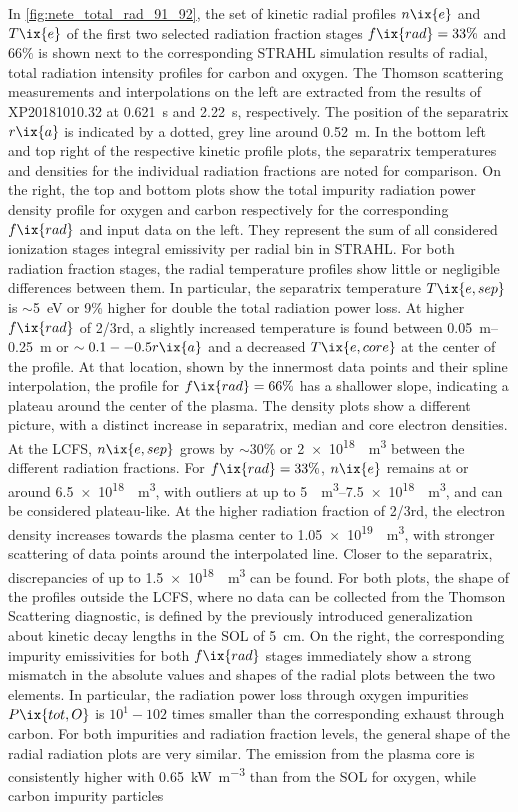         In \cref{fig:nete_total_rad_91_92}, the set of kinetic radial profiles $n\ix{e}$ and $T\ix{e}$ of the first two selected radiation fraction stages $f\ix{rad}=33\%$ and $66\%$ is shown next to the corresponding STRAHL simulation results of radial, total radiation intensity profiles for carbon and oxygen. The Thomson scattering measurements and interpolations on the left are extracted from the results of XP20181010.32 at \SI{0.621}{\second} and \SI{2.22}{\second}, respectively. The position of the separatrix $r\ix{a}$ is indicated by a dotted, grey line around \SI{0.52}{\meter}. In the bottom left and top right of the respective kinetic profile plots, the separatrix temperatures and densities for the individual radiation fractions are noted for comparison. On the right, the top and bottom plots show the total impurity radiation power density profile for oxygen and carbon respectively for the corresponding $f\ix{rad}$ and input data on the left. They represent the sum of all considered ionization stages integral emissivity per radial bin in STRAHL. For both radiation fraction stages, the radial temperature profiles show little or negligible differences between them. In particular, the separatrix temperature $T\ix{e,sep}$ is $\sim$\SI{5}{\electronvolt} or 9\% higher for double the total radiation power loss. At higher $f\ix{rad}$ of 2/3rd, a slightly increased temperature is found between \SIrange{0.05}{0.25}{\meter} or $\sim0.1--0.5r\ix{a}$ and a decreased $T\ix{e,core}$ at the center of the profile. At that location, shown by the innermost data points and their spline interpolation, the profile for $f\ix{rad}=66\%$ has a shallower slope, indicating a plateau around the center of the plasma. The density plots show a different picture, with a distinct increase in separatrix, median and core electron densities. At the LCFS, $n\ix{e,sep}$ grows by $\sim30\%$ or \SI{2e18}{\per\cubic\meter} between the different radiation fractions. For $f\ix{rad}=33\%$, $n\ix{e}$ remains at or around \SI{6.5e18}{\per\cubic\meter}, with outliers at up to \SIrange{5}{7.5e18}{\per\cubic\meter}, and can be considered plateau-like. At the higher radiation fraction of 2/3rd, the electron density increases towards the plasma center to \SI{1.05e19}{\per\cubic\meter}, with stronger scattering of data points around the interpolated line. Closer to the separatrix, discrepancies of up to \SI{1.5e18}{\per\cubic\meter} can be found. For both plots, the shape of the profiles outside the LCFS, where no data can be collected from the Thomson Scattering diagnostic, is defined by the previously introduced generalization about kinetic decay lengths in the SOL of \SI{5}{\centi\meter}. On the right, the corresponding impurity emissivities for both $f\ix{rad}$ stages immediately show a strong mismatch in the absolute values and shapes of the radial plots between the two elements. In particular, the radiation power loss through oxygen impurities $P\ix{tot,O}$ is $10^{1}-10{2}$ times smaller than the corresponding exhaust through carbon. For both impurities and radiation fraction levels, the general shape of the radial radiation plots are very similar. The emission from the plasma core is consistently higher with \SI{0.65}{\kilo\watt\per\cubic\meter} than from the SOL for oxygen, while carbon impurity particles 